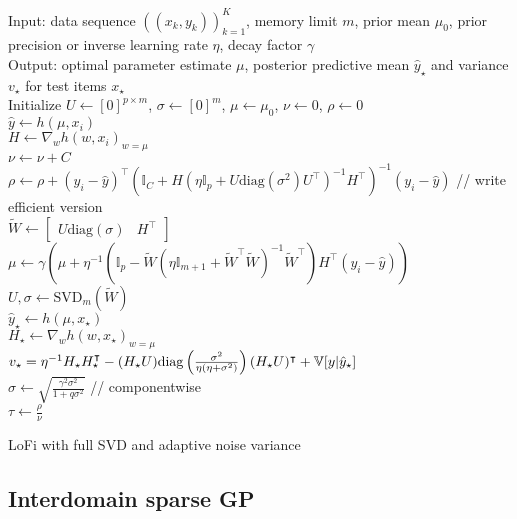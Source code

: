 \begin{algorithm}
\dontprintsemicolon
Input: data sequence $\left(\left(x_{k},y_{k}\right)\right)_{k=1}^{K}$,
memory limit $m$, prior mean $\mu_{0}$, prior precision or inverse learning rate $\eta$,
decay factor $\gamma$ \\
Output: optimal parameter estimate $\mu$, posterior predictive mean $\hat{y}_\star$ and variance $v_\star$ for test items $x_\star$ \\
Initialize $U\leftarrow\left[0\right]^{p\times m}$, $\sigma\leftarrow\left[0\right]^{m}$,
$\mu\leftarrow\mu_{0}$, $\nu\leftarrow0$, $\rho\leftarrow0$ \\
 {
$\hat{y}\leftarrow h\left(\mu,x_{i}\right)$ \\
$H\leftarrow\nabla_{w}h\left(w,x_{i}\right)_{w=\mu}$ \\
$\nu\leftarrow\nu+C$ \\
$\rho\leftarrow\rho+(y_i-\hat{y})^{\top}(\mathbb{I}_C+H\left(\eta\mathbb{I}_{p}+U\text{diag}(\sigma^2)U^{\top}\right)^{-1}H^{\top})^{-1}(y_i-\hat{y})$ // write efficient version\\
$\tilde{W}\leftarrow\left[\begin{array}{cc}U\text{diag}(\sigma) & H^{\top}\end{array}\right]$ \\
$\mu\leftarrow\gamma\left(\mu+\eta^{-1}\left(\mathbb{I}_{p}-\tilde{W}\left(\eta\mathbb{I}_{m+1}+\tilde{W}^{\top}\tilde{W}\right)^{-1}\tilde{W}^{\top}\right)H^{\top}\left(y_{i}-\hat{y}\right)\right)$ \\
$U,\sigma\leftarrow{\mathrm{SVD}}_m(\tilde{W})$ \\
 {
$\hat{y}_\star \leftarrow h(\mu,x_\star)$ \\
$H_\star\leftarrow\nabla_{w}h\left(w,x_\star\right)_{w=\mu}$ \\
$v_\star = \eta^{-1}H_\star H_\star^\intercal - (H_\star U) \mathrm{diag}\left(\frac{\sigma^2}{\eta(\eta+\sigma^2)}\right) (H_\star U)^\intercal + \mathbb{V}[y|\hat{y}_\star]$\\
}
$\sigma\leftarrow\sqrt{\frac{\gamma^{2}\sigma^{2}}{1+q\sigma^{2}}}$ // componentwise \\
}
$\tau\leftarrow\frac{\rho}{\nu}$
\caption{\label{alg:LoFi-full-SVD}LoFi with full SVD and adaptive noise variance}
\end{algorithm}

\subsection{Interdomain sparse GP}

